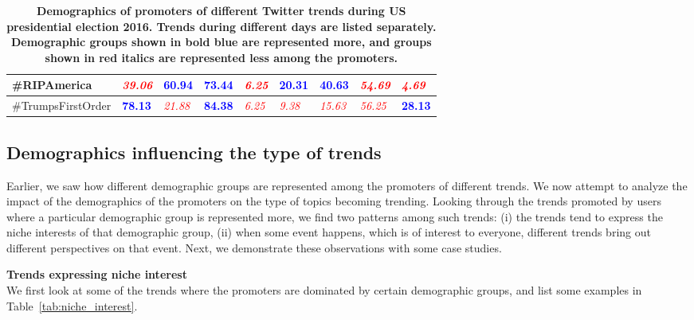 \documentclass[letterpaper]{article}
\begin{document}
\begin{table*}[t]
\begin{tabular}{|p{}|p{}|p{}||p{}|p{}|p{}||p{}|p{}|p{}|}
\hline
\#RIPAmerica & \textcolor{red}{\it 39.06} & \textcolor{blue}{\bf 60.94} &  \textcolor{blue}{\bf 73.44} & \textcolor{red}{\it 6.25} & \textcolor{blue}{\bf 20.31} &  \textcolor{blue}{\bf 40.63} & \textcolor{red}{\it 54.69} & \textcolor{red}{\it 4.69} \\
\hline
\#TrumpsFirstOrder & \textcolor{blue}{\bf 78.13} & \textcolor{red}{\it 21.88} &  \textcolor{blue}{\bf 84.38} & \textcolor{red}{\it 6.25} & \textcolor{red}{\it 9.38} &  \textcolor{red}{\it 15.63} & \textcolor{red}{\it 56.25} & \textcolor{blue}{\bf 28.13}  \\
\hline
\end{tabular}
\vspace*{-2mm}
\caption{{\bf Demographics of promoters of different Twitter trends during US presidential election 2016. Trends during different days are listed separately. Demographic groups shown in bold blue are represented more, and groups shown in red italics are represented less among the promoters.}}
\label{tab:us_election}
\vspace*{-5mm}
\end{table*}

\subsection{Demographics influencing the type of trends}
Earlier, we saw how different demographic groups are represented  among the
promoters of different trends. We now attempt to analyze the impact of  the demographics of the promoters on the type of topics becoming trending. Looking through the trends promoted by users where a particular demographic group is represented more, we find two patterns among such trends: (i) the trends tend to express the niche interests of that demographic group, (ii) when some event happens, which is of interest to everyone, different trends bring out different perspectives on that event. Next, we demonstrate these observations with some case studies.

\vspace{1mm}
\noindent \textbf{Trends expressing niche interest} \\
We first look at some of the trends where the promoters are dominated by certain demographic groups, and list some examples in Table~\ref{tab:niche_interest}.
\end{document}
